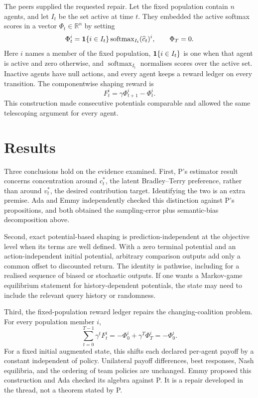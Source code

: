 \documentclass{article}
\begin{document}
The peers supplied the requested repair. Let the fixed population contain $n$ agents, and let $I_t$ be the set active at time $t$. They embedded the active softmax scores in a vector $\Phi_t\in\mathbb{R}^n$ by setting
\[
 \Phi_t^i={\bf 1}\{i\in I_t\}
 \operatorname{softmax}_{I_t}(\widehat c_t)^i,
 \qquad \Phi_T=0.
\]
Here $i$ names a member of the fixed population, ${\bf 1}\{i\in I_t\}$ is one when that agent is active and zero otherwise, and $\operatorname{softmax}_{I_t}$ normalises scores over the active set. Inactive agents have null actions, and every agent keeps a reward ledger on every transition. The componentwise shaping reward is
\[
 F_t^i=\gamma\Phi_{t+1}^i-\Phi_t^i.
\]
This construction made consecutive potentials comparable and allowed the same telescoping argument for every agent.

\section{Results}

Three conclusions hold on the evidence examined. First, P's estimator result concerns concentration around $c_t^*$, the latent Bradley--Terry preference, rather than around $v_t^*$, the desired contribution target. Identifying the two is an extra premise. Ada and Emmy independently checked this distinction against P's propositions, and both obtained the sampling-error plus semantic-bias decomposition above.

Second, exact potential-based shaping is prediction-independent at the objective level when its terms are well defined. With a zero terminal potential and an action-independent initial potential, arbitrary comparison outputs add only a common offset to discounted return. The identity is pathwise, including for a realised sequence of biased or stochastic outputs. If one wants a Markov-game equilibrium statement for history-dependent potentials, the state may need to include the relevant query history or randomness.

Third, the fixed-population reward ledger repairs the changing-coalition problem. For every population member $i$,
\[
 \sum_{t=0}^{T-1}\gamma^tF_t^i
 =-\Phi_0^i+\gamma^T\Phi_T^i=-\Phi_0^i.
\]
For a fixed initial augmented state, this shifts each declared per-agent payoff by a constant independent of policy. Unilateral payoff differences, best responses, Nash equilibria, and the ordering of team policies are unchanged. Emmy proposed this construction and Ada checked its algebra against P. It is a repair developed in the thread, not a theorem stated by P.
\end{document}
